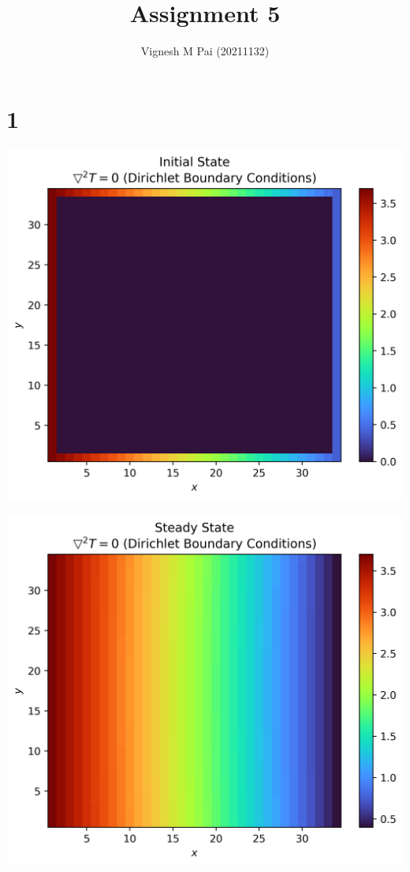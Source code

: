 \documentclass{article}
\title{Assignment 5}
\author{Vignesh M Pai (20211132)}
\date{}
\begin{document}
\maketitle

\section*{1}

\begin{center}
    \includegraphics*[scale=0.8]{1i.png}
\end{center}

\begin{center}
    \includegraphics*[scale=0.8]{1.png}
\end{center}
\end{document}
